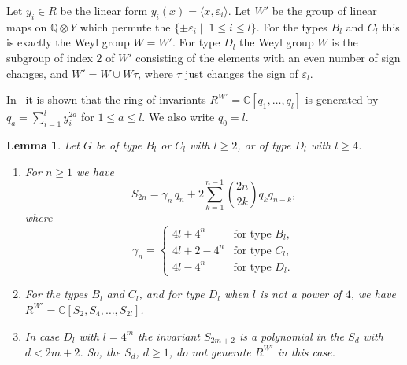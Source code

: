 \documentclass[11pt,a4paper]{article}
\theoremstyle{plain}
\newtheorem{La}[Thm]{Lemma}
\theoremstyle{definition}
\newcommand{\C}{\mathbb{C}}
\newcommand{\Q}{\mathbb{Q}}
\begin{document}
Let $y_i \in R$ be the linear form $y_i(x) = \langle
x, \varepsilon_i \rangle$.
Let $W'$ be the group of linear maps on $\Q \otimes Y$ which permute the
$\{\pm \varepsilon_i\mid\; 1\leq i \leq l\}$. 
For the types $B_l$ and
$C_l$ this is exactly the Weyl group  $W = W'$. 
For type $D_l$ the Weyl group $W$ is the subgroup of
index $2$ of $W'$ consisting of the elements with an even number of sign
changes, and $W' = W \cup W\tau$, where $\tau$ just changes the sign of
$\varepsilon_l$. 

In~\cite[3.12]{humrg} it is shown that the ring of invariants $R^{W'}
= \C[q_1, \ldots, q_l]$ is generated by  $q_a = \sum_{i=1}^l y_i^{2a}$
for $1\leq a \leq l$. We also write $q_0 = l$.

\begin{La}\label{laBC}
Let $G$ be of type $B_l$ or $C_l$ with $l \geq 2$, or of type $D_l$ with $l
\geq 4$. 
\begin{enumerate}
\item For $n \geq 1$ we have
\[ S_{2n} = \gamma_n\, q_n + 2 \sum_{k=1}^{n-1} \binom{2n}{2k} q_k
q_{n-k}, \]
where
\[ \gamma_n = \begin{cases} 4l + 4^n & \textrm{for type } B_l, \\ 
4l + 2 - 4^n & \textrm{for type } C_l, \\
4l - 4^n & \textrm{for type } D_l. \end{cases} \]
\item For the types $B_l$ and $C_l$, and for type $D_l$ when $l$ is not a
power of $4$, we have $R^{W'} = \C[S_2, S_4, \ldots, S_{2l}]$.
\item In case $D_l$ with $l = 4^m$ the invariant $S_{2m + 2}$ is a
polynomial in the $S_d$ with $d < 2m+2$. So, the $S_d$, $d \geq 1$, do not
generate $R^{W'}$ in this case.
\end{enumerate}
\end{La}
\end{document}
